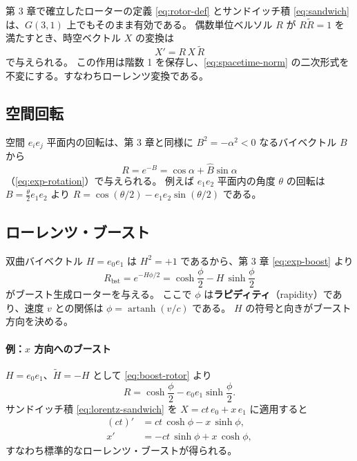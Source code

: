 \documentclass[dvipdfmx,a4paper,oneside]{jsbook}
\numberwithin{equation}{chapter}
\begin{document}
第 3 章で確立したローターの定義 \eqref{eq:rotor-def} とサンドイッチ積 \eqref{eq:sandwich} は、\(G(3,1)\) 上でもそのまま有効である。
偶数単位ベルソル \(R\) が \(R\widetilde{R} = 1\) を満たすとき、時空ベクトル \(X\) の変換は
\begin{equation}
  X' = R\,X\,\widetilde{R}
  \label{eq:lorentz-sandwich}
\end{equation}
で与えられる。
この作用は階数 1 を保存し、\eqref{eq:spacetime-norm} の二次形式を不変にする。すなわちローレンツ変換である。

\subsection{空間回転}

空間 \(e_i e_j\) 平面内の回転は、第 3 章と同様に \(B^2 = -\alpha^2 < 0\) なるバイベクトル \(B\) から
\begin{equation}
  R = e^{-B} = \cos\alpha + \hat{B}\sin\alpha
  \label{eq:rotation-rotor}
\end{equation}
（\eqref{eq:exp-rotation}）で与えられる。
例えば \(e_1 e_2\) 平面内の角度 \(\theta\) の回転は \(B = \tfrac{\theta}{2} e_1 e_2\) より \(R = \cos(\theta/2) - e_1 e_2 \sin(\theta/2)\) である。

\subsection{ローレンツ・ブースト}

双曲バイベクトル \(H = e_0 e_1\) は \(H^2 = +1\) であるから、第 3 章 \eqref{eq:exp-boost} より
\begin{equation}
  R_{\mathrm{bst}} = e^{-H\phi/2} = \cosh\frac{\phi}{2} - H\,\sinh\frac{\phi}{2}
  \label{eq:boost-rotor}
\end{equation}
がブースト生成ローターを与える。
ここで \(\phi\) は\textbf{ラピディティ}（rapidity）であり、速度 \(v\) との関係は \(\phi = \operatorname{artanh}(v/c)\) である。
\(H\) の符号と向きがブースト方向を決める。

\paragraph{例：\(x\) 方向へのブースト}
\(H = e_0 e_1\)、\(\widetilde{H} = -H\) として \eqref{eq:boost-rotor} より
\[
R = \cosh\frac{\phi}{2} - e_0 e_1 \sinh\frac{\phi}{2}.
\]
サンドイッチ積 \eqref{eq:lorentz-sandwich} を \(X = ct\, e_0 + x\, e_1\) に適用すると
\begin{align}
  (ct)' &= ct\,\cosh\phi - x\,\sinh\phi, \\
  x'    &= -ct\,\sinh\phi + x\,\cosh\phi,
\end{align}
すなわち標準的なローレンツ・ブーストが得られる。
\end{document}
